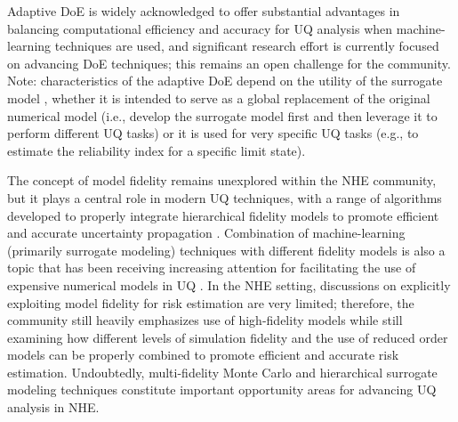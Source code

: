 Adaptive DoE is widely acknowledged to offer substantial advantages in balancing computational efficiency and accuracy for UQ analysis when machine-learning techniques are used, and significant research effort is currently focused on advancing DoE techniques; this remains an open challenge for the community. Note: characteristics of the adaptive DoE depend on the utility of the surrogate model \citep{liu2018survey}, whether it is intended to serve as a global replacement of the original numerical model (i.e., develop the surrogate model first and then leverage it to perform different UQ tasks) or it is used for very specific UQ tasks (e.g., to estimate the reliability index for a specific limit state). 

The concept of model fidelity remains unexplored within the NHE community, but it plays a central role in modern UQ techniques, with a range of algorithms developed to properly integrate hierarchical fidelity models to promote efficient and accurate uncertainty propagation \citep{geraci2017multifidelity, peherstorfer2018survey}. Combination of machine-learning (primarily surrogate modeling) techniques with different fidelity models is also a topic that has been receiving increasing attention for facilitating the use of expensive numerical models in UQ \citep{debaar2015uncertainty, zhou2016active}. In the NHE setting, discussions on explicitly exploiting model fidelity for risk estimation are very limited; therefore, the community still heavily emphasizes use of high-fidelity models while still examining how different levels of simulation fidelity and the use of reduced order models can be properly combined to promote efficient and accurate risk estimation. Undoubtedly, multi-fidelity Monte Carlo and hierarchical surrogate modeling techniques constitute important opportunity areas for advancing UQ analysis in NHE.

